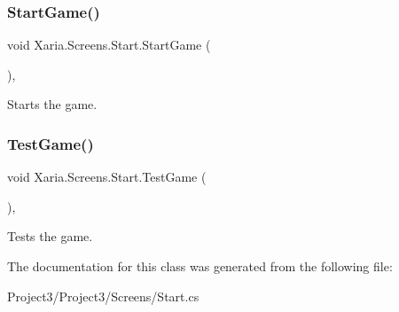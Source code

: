 \subsubsection{\texorpdfstring{Start\+Game()}{StartGame()}}
{\footnotesize\ttfamily void Xaria.\+Screens.\+Start.\+Start\+Game (\begin{DoxyParamCaption}{ }\end{DoxyParamCaption})\hspace{0.3cm}{\ttfamily [inline]}, {\ttfamily [private]}}



Starts the game. 

\mbox{\label{classXaria_1_1Screens_1_1Start_ae94182dbd1a9186a589364962c718418}} 
\subsubsection{\texorpdfstring{Test\+Game()}{TestGame()}}
{\footnotesize\ttfamily void Xaria.\+Screens.\+Start.\+Test\+Game (\begin{DoxyParamCaption}{ }\end{DoxyParamCaption})\hspace{0.3cm}{\ttfamily [inline]}, {\ttfamily [private]}}



Tests the game. 



The documentation for this class was generated from the following file\+:\begin{DoxyCompactItemize}
\item 
Project3/\+Project3/\+Screens/Start.\+cs\end{DoxyCompactItemize}
